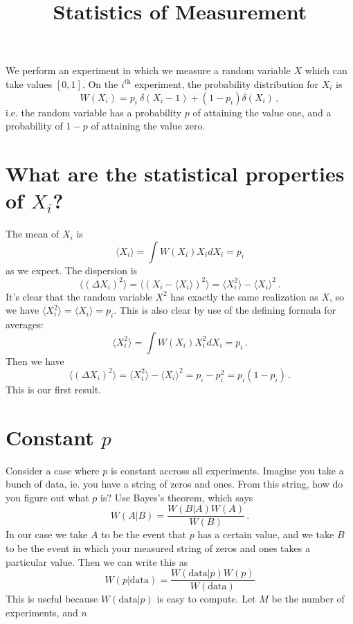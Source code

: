\documentclass{article}
\begin{document}
\title{Statistics of Measurement}

\maketitle
We perform an experiment in which we measure a random variable $X$ which can take values $[0,1]$.
On the $i^{\textrm{th}}$ experiment, the probability distribution for $X_{i}$ is
\begin{equation}
W(X_i) = p_i\ \delta(X_i - 1) + (1 - p_i) \delta(X_i) \, ,
\end{equation}
i.e. the random variable has a probability $p$ of attaining the value one, and a probability of $1-p$ of attaining the value zero.


\section*{What are the statistical properties of $X_i$?}

The mean of $X_i$ is
\begin{equation}
\langle X_i \rangle = \int W(X_i) X_i dX_i = p_{i}
\end{equation}
as we expect.
The dispersion is
\begin{equation}
\langle(\Delta X_i)^2 \rangle = \langle(X_i - \langle X_i \rangle)^2 \rangle = \langle X_i^2 \rangle - \langle X_i \rangle^2 \, .
\end{equation}
It's clear that the random variable $X^2$ has exactly the same realization as $X$, so we have $\langle X_i^{2} \rangle = \langle X_i \rangle = p_i$.
This is also clear by use of the defining formula for averages:
\begin{equation}
\langle X_i^2 \rangle = \int W(X_i) X_i^2 dX_i = p_i \, .
\end{equation}
Then we have
\begin{equation}
\langle(\Delta X_i)^2 \rangle = \langle X_i^2 \rangle - \langle X_i \rangle^2 = p_i - p_i^2 = p_i(1 - p_i) \, .
\end{equation}
This is our first result.


\section*{Constant $p$}

Consider a case where $p$ is constant accross all experiments.
Imagine you take a bunch of data, ie. you have a string of zeros and ones.
From this string, how do you figure out what $p$ is?
Use Bayes's theorem, which says
\begin{equation}
W(A|B)=\frac{W(B|A)W(A)}{W(B)} \, .
\end{equation}
In our case we take $A$ to be the event that $p$ has a certain value, and we take $B$ to be the event in which your measured string of zeros and ones takes a particular value.
Then we can write this as
\begin{equation}
W(p|\textrm{data})=\frac{W(\textrm{data}|p)W(p)}{W(\textrm{data})}
\end{equation}
This is useful because $W(\textrm{data}|p)$ is easy to compute. Let
$M$ be the number of experiments, and $n$
\end{document}
